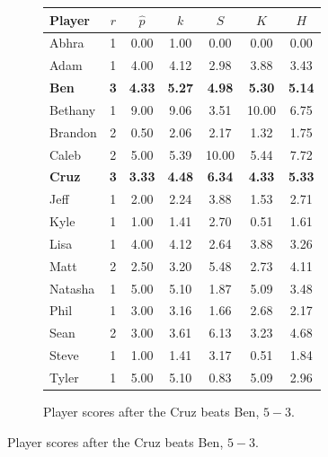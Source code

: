 \documentclass[letterpaper, 10 pt, conference]{ieeeconf}  %
\begin{document}
\begin{figure}[h!b]
        \begin{subfigure}[hb]{0.4\textwidth}
                \footnotesize
                \centering
                \begin{tabular}{lccc|ccc}
                        \toprule
                        Player	&	$r$	&	$\hat{p}$	&	$k$	&	$S$	&	$K$	&	$H$	\\
                        \midrule													
                        Abhra	&	1	&	0.00	&	1.00	&	0.00	&	0.00	&	0.00	\\
                        Adam	&	1	&	4.00	&	4.12	&	2.98	&	3.88	&	3.43	\\
                        \textbf{Ben}	&	\textbf{3}	&	\textbf{4.33}	&	\textbf{5.27}	&	\textbf{4.98}	&	\textbf{5.30}	&	\textbf{5.14}	\\
                        Bethany	&	1	&	9.00	&	9.06	&	3.51	&	10.00	&	6.75	\\
                        Brandon	&	2	&	0.50	&	2.06	&	2.17	&	1.32	&	1.75	\\
                        Caleb	&	2	&	5.00	&	5.39	&	10.00	&	5.44	&	7.72	\\
                        \textbf{Cruz}	&	\textbf{3}	&	\textbf{3.33}	&	\textbf{4.48}	&	\textbf{6.34}	&	\textbf{4.33}	&	\textbf{5.33}	\\
                        Jeff	&	1	&	2.00	&	2.24	&	3.88	&	1.53	&	2.71	\\
                        Kyle	&	1	&	1.00	&	1.41	&	2.70	&	0.51	&	1.61	\\
                        Lisa	&	1	&	4.00	&	4.12	&	2.64	&	3.88	&	3.26	\\
                        Matt	&	2	&	2.50	&	3.20	&	5.48	&	2.73	&	4.11	\\
                        Natasha	&	1	&	5.00	&	5.10	&	1.87	&	5.09	&	3.48	\\
                        Phil	&	1	&	3.00	&	3.16	&	1.66	&	2.68	&	2.17	\\
                        Sean	&	2	&	3.00	&	3.61	&	6.13	&	3.23	&	4.68	\\
                        Steve	&	1	&	1.00	&	1.41	&	3.17	&	0.51	&	1.84	\\
                        Tyler	&	1	&	5.00	&	5.10	&	0.83	&	5.09	&	2.96	\\
                        \bottomrule
                \end{tabular}
                \caption{Player scores after the Cruz beats Ben, $5-3$.}
        \end{subfigure}


\end{figure}
\end{document}
